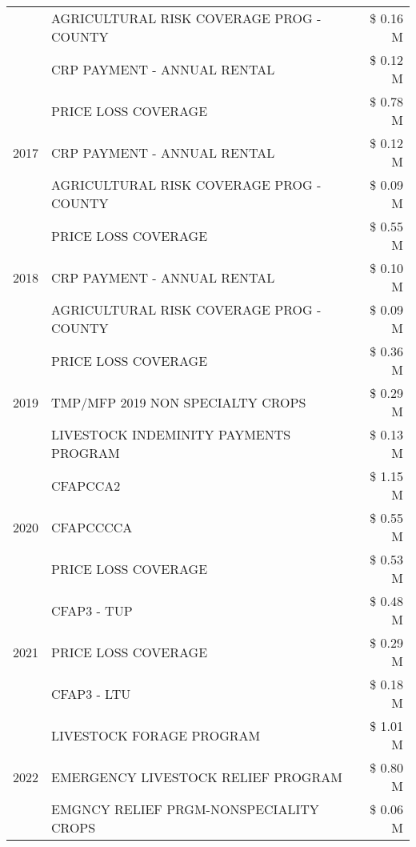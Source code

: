 \begin{tabular}{llr}
 & AGRICULTURAL RISK COVERAGE PROG - COUNTY & \$ 0.16 M \\
 & CRP PAYMENT - ANNUAL RENTAL & \$ 0.12 M \\
\cline{1-3}
\multirow[t]{3}{*}{2017} & PRICE LOSS COVERAGE & \$ 0.78 M \\
 & CRP PAYMENT - ANNUAL RENTAL & \$ 0.12 M \\
 & AGRICULTURAL RISK COVERAGE PROG - COUNTY & \$ 0.09 M \\
\cline{1-3}
\multirow[t]{3}{*}{2018} & PRICE LOSS COVERAGE & \$ 0.55 M \\
 & CRP PAYMENT - ANNUAL RENTAL & \$ 0.10 M \\
 & AGRICULTURAL RISK COVERAGE PROG - COUNTY & \$ 0.09 M \\
\cline{1-3}
\multirow[t]{3}{*}{2019} & PRICE LOSS COVERAGE & \$ 0.36 M \\
 & TMP/MFP 2019 NON SPECIALTY CROPS & \$ 0.29 M \\
 & LIVESTOCK INDEMINITY PAYMENTS PROGRAM & \$ 0.13 M \\
\cline{1-3}
\multirow[t]{3}{*}{2020} & CFAPCCA2 & \$ 1.15 M \\
 & CFAPCCCCA & \$ 0.55 M \\
 & PRICE LOSS COVERAGE & \$ 0.53 M \\
\cline{1-3}
\multirow[t]{3}{*}{2021} & CFAP3 - TUP & \$ 0.48 M \\
 & PRICE LOSS COVERAGE & \$ 0.29 M \\
 & CFAP3 - LTU & \$ 0.18 M \\
\cline{1-3}
\multirow[t]{3}{*}{2022} & LIVESTOCK FORAGE PROGRAM & \$ 1.01 M \\
 & EMERGENCY LIVESTOCK RELIEF PROGRAM & \$ 0.80 M \\
 & EMGNCY RELIEF PRGM-NONSPECIALITY CROPS & \$ 0.06 M \\
\cline{1-3}
\bottomrule
\end{tabular}
